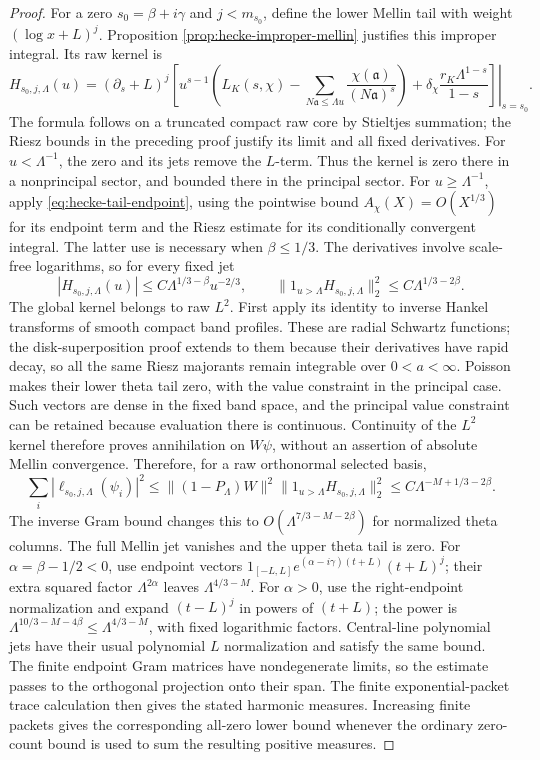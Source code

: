 \begin{proof}
For a zero $s_0=\beta+i\gamma$ and $j<m_{s_0}$, define the lower
Mellin tail with weight $(\log x+L)^j$.  Proposition
\ref{prop:hecke-improper-mellin} justifies this improper integral.
Its raw kernel is
\[
 H_{s_0,j,\Lambda}(u)=
 \left.(\partial_s+L)^j\left[
 u^{s-1}\left(L_K(s,\chi)
       -\sum_{N\mathfrak a\leq\Lambda u}
            \frac{\chi(\mathfrak a)}{(N\mathfrak a)^s}\right)
 +\delta_\chi\frac{r_K\Lambda^{1-s}}{1-s}
 \right]\right|_{s=s_0}.
\]
The formula follows on a truncated compact raw core by Stieltjes
summation; the Riesz bounds in the preceding proof justify its
limit and all fixed derivatives.  For $u<\Lambda^{-1}$, the zero
and its jets remove the $L$-term.  Thus the kernel is zero there
in a nonprincipal sector, and bounded there in the principal
sector.  For $u\geq\Lambda^{-1}$, apply
\eqref{eq:hecke-tail-endpoint}, using the pointwise bound
$A_\chi(X)=O(X^{1/3})$ for its endpoint term and the Riesz estimate
for its conditionally convergent integral.  The latter use is
necessary when $\beta\leq1/3$.  The derivatives involve scale-free
logarithms, so for every fixed jet
\[
 |H_{s_0,j,\Lambda}(u)|
       \leq C\Lambda^{1/3-\beta}u^{-2/3},
 \qquad
 \|1_{u>\Lambda}H_{s_0,j,\Lambda}\|_2^2
       \leq C\Lambda^{1/3-2\beta}.
\]
The global kernel belongs to raw $L^2$.  First apply its identity
to inverse Hankel transforms of smooth compact band profiles.
These are radial Schwartz functions; the disk-superposition proof
extends to them because their derivatives have rapid decay, so all
the same Riesz majorants remain integrable over $0<a<\infty$.
Poisson makes their lower theta tail zero, with the value constraint
in the principal case.  Such vectors are dense in the fixed band
space, and the principal value constraint can be retained because
evaluation there is continuous.  Continuity of the $L^2$ kernel
therefore proves annihilation on $W\psi$, without an assertion of
absolute Mellin convergence.
Therefore, for a raw orthonormal selected basis,
\[
 \sum_i|\ell_{s_0,j,\Lambda}(\psi_i)|^2
 \leq\|(1-P_\Lambda)W\|^2
         \|1_{u>\Lambda}H_{s_0,j,\Lambda}\|_2^2
 \leq C\Lambda^{-M+1/3-2\beta}.
\]
The inverse Gram bound changes this to
$O(\Lambda^{7/3-M-2\beta})$ for normalized theta columns.
The full Mellin jet vanishes and the upper theta tail is zero.
For $\alpha=\beta-1/2<0$, use endpoint vectors
$1_{[-L,L]}e^{(\alpha-i\gamma)(t+L)}(t+L)^j$; their extra squared
factor $\Lambda^{2\alpha}$ leaves $\Lambda^{4/3-M}$.
For $\alpha>0$, use the right-endpoint normalization and expand
$(t-L)^j$ in powers of $(t+L)$; the power is
$\Lambda^{10/3-M-4\beta}\leq\Lambda^{4/3-M}$, with fixed
logarithmic factors.  Central-line polynomial jets have their
usual polynomial $L$ normalization and satisfy the same bound.
The finite endpoint Gram matrices have nondegenerate limits, so
the estimate passes to the orthogonal projection onto their span.
The finite exponential-packet trace calculation then gives the
stated harmonic measures.  Increasing finite packets gives the
corresponding all-zero lower bound whenever the ordinary zero-count
bound is used to sum the resulting positive measures.
\end{proof}

